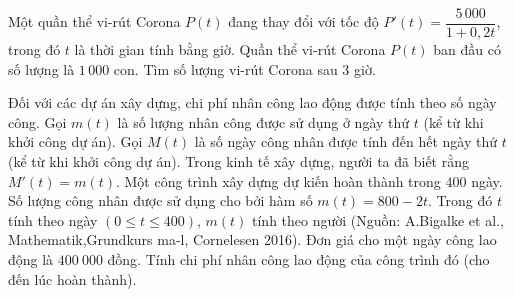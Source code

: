 \begin{bt}%
	Một quần thể vi-rút Corona $P(t)$ đang thay đổi với tốc độ ${P}'\left( t \right)=\dfrac{5\,000}{1+0,2t}$, trong đó $t$ là thời gian tính bằng giờ. Quần thể vi-rút Corona  $P(t)$ ban đầu có số lượng là $1\,000$ con. Tìm số lượng vi-rút Corona sau $3$ giờ.
\end{bt}

\begin{bt}%
	Đối với các dự án xây dựng, chi phí nhân công lao động được tính theo số ngày công. Gọi $m(t)$ là số lượng nhân công được sử dụng ở ngày thứ $t$ (kể từ khi khởi công dự án). Gọi $M(t)$ là số ngày công nhân được tính đến hết ngày thứ $t$ (kể từ khi khởi công dự án). Trong kinh tế xây dựng, người ta đã biết rằng $M'(t)=m(t)$. Một công trình xây dựng dự kiến hoàn thành trong $400$ ngày. Số lượng công nhân được sử dụng cho bởi hàm số $m(t)=800-2t$. Trong đó $t$ tính theo ngày $(0\le t\le 400)$, $m(t)$ tính theo người  (Nguồn: A.Bigalke et al., Mathematik,Grundkurs ma-l, Cornelesen 2016). Đơn giá cho một ngày công lao động là $400~000$ đồng. Tính chi phí nhân công lao động của công trình đó (cho đến lúc hoàn thành).
\end{bt}

